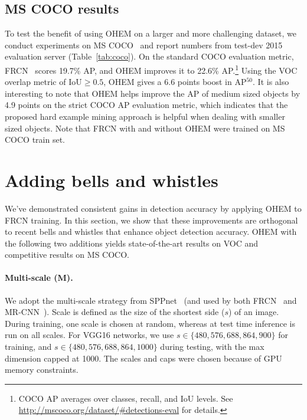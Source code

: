 \documentclass[10pt,twocolumn,letterpaper]{article}
\begin{document}
\subsection{MS COCO results}
To test the benefit of using OHEM on a larger and more challenging dataset, we conduct experiments on MS COCO~\cite{coco} and report numbers from test-dev 2015 evaluation server (Table~\ref{tab:coco}). On the standard COCO evaluation metric, FRCN~\cite{frcn} scores 19.7\% AP, and OHEM improves it to 22.6\% AP.\footnote{COCO AP averages over classes, recall, and IoU levels. See \url{http://mscoco.org/dataset/\#detections-eval} for details.} Using the VOC overlap metric of $\text{IoU}\ge0.5$, OHEM gives a 6.6 points boost in AP$^{50}$. It is also interesting to note that OHEM helps improve the AP of medium sized objects by 4.9 points on the strict COCO AP evaluation metric, which indicates that the proposed hard example mining approach is helpful when dealing with smaller sized objects. Note that FRCN with and without OHEM were trained on MS COCO train set.

\section{Adding bells and whistles}
We've demonstrated consistent gains in detection accuracy by applying OHEM to FRCN training. In this section, we show that these improvements are orthogonal to recent bells and whistles that enhance object detection accuracy. OHEM with the following two additions yields state-of-the-art results on VOC and competitive results on MS COCO.


\vspace{-0.15in}
\paragraph{Multi-scale (M).} We adopt the multi-scale strategy from SPPnet~\cite{SPPnet} (and used by both FRCN~\cite{frcn} and MR-CNN~\cite{mrcnn}). Scale is defined as the size of the shortest side ($s$) of an image. During training, one scale is chosen at random, whereas at test time inference is run on all scales. For VGG16 networks, we use $s \in \{480, 576, 688, 864, 900\}$ for training, and $s \in \{480, 576, 688, 864, 1000\}$ during testing, with the max dimension capped at 1000. The scales and caps were chosen because of GPU memory constraints.
\end{document}
